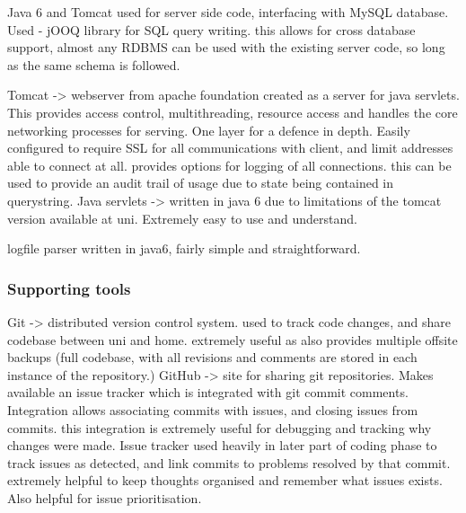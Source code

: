 Java 6 and Tomcat used for server side code, interfacing with MySQL database.
Used - jOOQ library for SQL query writing. this allows for cross database support, almost any RDBMS can be used with the existing server code, so long as the same schema is followed.

Tomcat -> webserver from apache foundation created as a server for java servlets. This provides access control, multithreading, resource access and handles the core networking processes for serving. One layer for a defence in depth. Easily configured to require SSL for all communications with client, and limit addresses able to connect at all.
provides options for logging of all connections. this can be used to provide an audit trail of usage due to state being contained in querystring.
Java servlets -> written in java 6 due to limitations of the tomcat version available at uni. Extremely easy to use and understand.

logfile parser written in java6, fairly simple and straightforward.

\subsubsection{Supporting tools}
Git -> distributed version control system. used to track code changes, and share codebase between uni and home. extremely useful as also provides multiple offsite backups (full codebase, with all revisions and comments are stored in each instance of the repository.)
GitHub -> site for sharing git repositories. Makes available an issue tracker which is integrated with git commit comments. Integration allows associating commits with issues, and closing issues from commits. this integration is extremely useful for debugging and tracking why changes were made. Issue tracker used heavily in later part of coding phase to track issues as detected, and link commits to problems resolved by that commit.
extremely helpful to keep thoughts organised and remember what issues exists. Also helpful for issue prioritisation.
